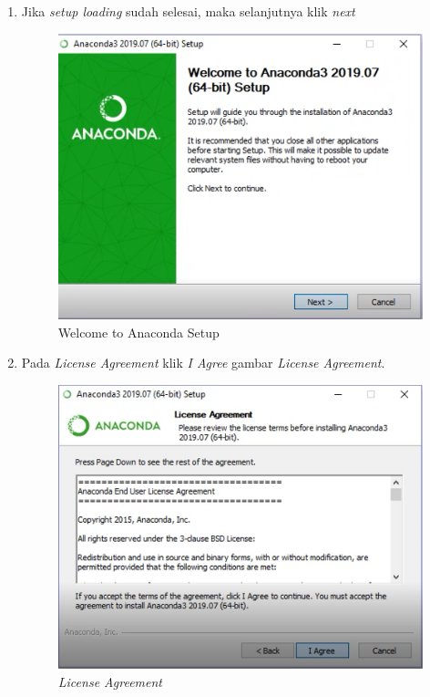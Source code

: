 \begin{enumerate}
\item Jika \textit{setup loading} sudah selesai, maka selanjutnya klik \textit{next}
\begin{figure}[H]
        \centerline{\includegraphics[scale=0.5]{figures/3}}
        \caption{Welcome to Anaconda Setup}
		\label{langkah2}
\end{figure}


\item Pada \textit{License Agreement} klik \textit{I Agree}
 gambar \textit{License Agreement}.

\begin{figure}[H]
    \centering
    \includegraphics[scale=0.5]{figures/4}
    \caption{\textit{License Agreement}}
    \label{Figureanaconda3}
\end{figure}



\end{enumerate}
